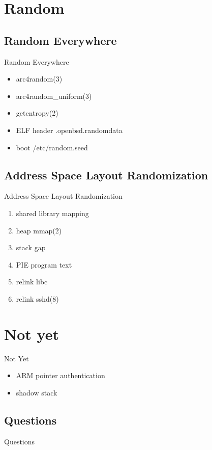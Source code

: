 \documentclass[14pt,aspectratio=169]{beamer}
\begin{document}
\section{Random}

\subsection{Random Everywhere}
\begin{frame}{Random Everywhere}
\begin{itemize}
  \item arc4random(3)
  \item arc4random\_uniform(3)
  \item getentropy(2)
  \item ELF header .openbsd.randomdata
  \item boot /etc/random.seed
\end{itemize}
\end{frame}

\subsection{Address Space Layout Randomization}
\begin{frame}{Address Space Layout Randomization}
\begin{enumerate}
  \item shared library mapping
  \item heap mmap(2)
  \item stack gap
  \item PIE program text
  \item relink libc
  \item relink sshd(8)
\end{enumerate}
\end{frame}

\section{Not yet}
\begin{frame}{Not Yet}
\begin{itemize}
  \item ARM pointer authentication
  \item shadow stack
\end{itemize}
\end{frame}

\subsection{Questions}
\begin{frame}{Questions}
\begin{center}
\end{center}
\end{frame}
\end{document}
